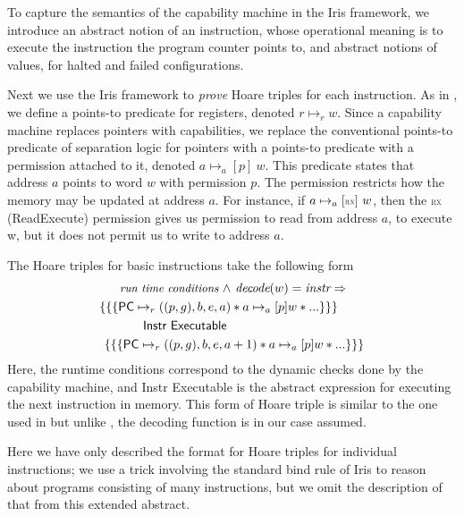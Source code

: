 \documentclass[sigplan,review]{acmart}\settopmatter{printfolios=true,printccs=false,printacmref=false}
\begin{document}
To capture the semantics of the capability machine in the Iris framework, we introduce an abstract notion of an instruction, whose operational meaning is to execute the instruction the program counter points to, and abstract notions of values, for halted and failed configurations.

Next we use the Iris framework to \emph{prove} Hoare triples for each instruction.
As in \cite{Jensen:2013}, we define a points-to predicate for registers, denoted $r \mapsto_r w$.
Since a capability machine replaces pointers with capabilities, we replace the conventional points-to predicate of separation logic for pointers with a points-to predicate with a permission attached to it, denoted
$a \mapsto_a[p]~w$. 
This predicate states that address $a$ points to word $w$ with permission $p$.
The permission restricts how the memory may be updated at address $a$.
For instance, if $a \mapsto_a[\textsc{\tiny RX}]~w$, then the $\textsc{\tiny RX}$ (ReadExecute)
permission gives us permission to read from address $a$, to execute w, but it does not permit us to write to address $a$.

The Hoare triples for basic instructions take the following form
\begin{align*}
\small
	\textit{run time conditions } \wedge &\textit{ decode}(w) = \emph{instr} \Rightarrow  \\
	\{\{\{ \textsf{PC} \mapsto_r ((p,g),b,e,a) &* a \mapsto_a[p] w * ... \}\}\} \\ 
	\textsf{Instr Executable }\\
	\{\{\{\textsf{PC} \mapsto_r ((p,g),b,e,a&+1) * a \mapsto_a[p] w * ... \}\}\}
\end{align*} 
Here, the runtime conditions correspond to the dynamic checks done by the capability machine, and \textsf{Instr Executable} is the abstract expression for executing the next instruction in memory.
This form of Hoare triple is similar to the one used in \cite{Jensen:2013} but
unlike \cite{Jensen:2013}, the decoding function is in our case assumed.

Here we have only described the format for Hoare triples for individual instructions; we use a trick involving the standard bind rule of Iris to reason about programs consisting of many instructions, but we omit the description of that from this extended abstract.
\end{document}
